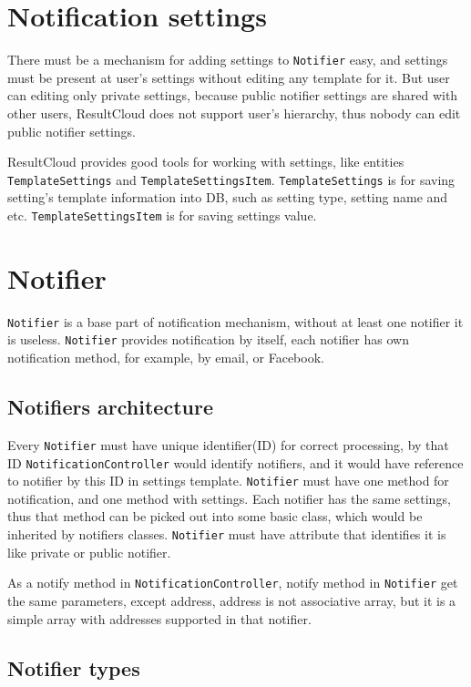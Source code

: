 \section{Notification settings}

There must be a mechanism for adding settings to \texttt{Notifier} easy, and settings must be present at user's settings without editing any template for it. But user can editing only private settings, because public notifier settings are shared with other users, ResultCloud does not support user's hierarchy, thus nobody can edit public notifier settings.

ResultCloud provides good tools for working with settings, like entities \texttt{TemplateSettings} and \texttt{TemplateSettingsItem}. \texttt{TemplateSettings} is for saving setting's template information into DB, such as setting type, setting name and etc. \texttt{TemplateSettingsItem} is for saving settings value.

\section{Notifier}

\texttt{Notifier} is a base part of notification mechanism, without at least one notifier it is useless. \texttt{Notifier} provides notification by itself, each notifier has own notification method, for example, by email, or Facebook.

\subsection{Notifiers architecture}

Every \texttt{Notifier} must have unique identifier(ID) for correct processing, by that ID \texttt{Notification\-Controller} would identify notifiers, and it would have reference to notifier by this ID in settings template. \texttt{Notifier} must have one method for notification, and one method with settings. Each notifier has the same settings, thus that method can be picked out into some basic class, which would be inherited by notifiers classes. \texttt{Notifier} must have attribute that identifies it is like private or public notifier.

As a notify method in \texttt{NotificationController}, notify method in \texttt{Notifier} get the same parameters, except address, address is not associative array, but it is a simple array with addresses supported in that notifier. 

\subsection{Notifier types}

